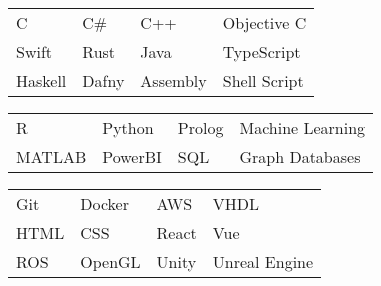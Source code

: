 \documentclass[paper=a4,fontsize=9pt]{resume}
\begin{document}
{	
		\begin{tabular}{llll}
			C & C\# & C++ & Objective C \\
			Swift & Rust & Java & TypeScript \\
			Haskell & Dafny & Assembly & Shell Script
		\end{tabular}

		\medskip\normalsize

		\begin{tabular}{llll}
			R & Python & Prolog & Machine Learning \\
			MATLAB & PowerBI & SQL & Graph Databases
		\end{tabular}

		\medskip\normalsize

		\begin{tabular}{llll}
			Git & Docker & AWS & VHDL \\
			HTML & CSS & React & Vue \\
			ROS & OpenGL & Unity & Unreal Engine \\
		\end{tabular}

}
\end{document}

